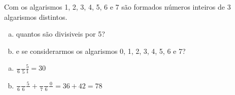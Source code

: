 \begin{ex}
 Com os algarismos 1, 2, 3, 4, 5, 6 e 7 são formados números inteiros de 3 algarismos distintos.
    \begin{enumerate}[(a)]
    \item quantos são divisiveis por 5?
    \item e se considerarmos os algarismos 0, 1, 2, 3, 4, 5, 6 e 7?
    \end{enumerate}
    \begin{sol}
        \phantom{A} 
     \begin{enumerate} [(a)]
         \item $\frac{\phantom{A}}{6}\frac{\phantom{A}}{5}\frac{5}{1} = 30$
         \item $\frac{\phantom{A}}{6}\frac{\phantom{A}}{6}\frac{5}{\phantom{A}}+\frac{\phantom{A}}{7}\frac{\phantom{A}}{6}\frac{0}{\phantom{A}}= 36+42=78$
     \end{enumerate}
    \end{sol}
\end{ex}